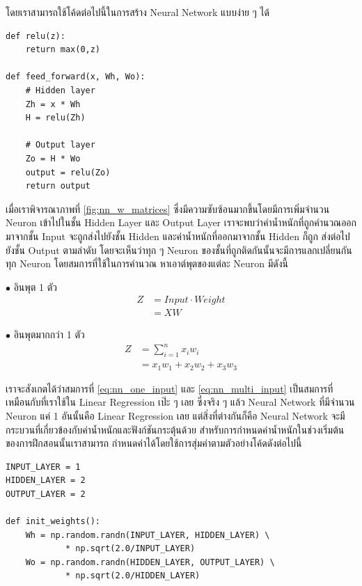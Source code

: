 โดยเราสามารถใช้โค้ดต่อไปนี้ในการสร้าง Neural Network แบบง่าย ๆ ได้

\begin{lstlisting}[style=MyPython]
def relu(z):
    return max(0,z)

def feed_forward(x, Wh, Wo):
    # Hidden layer
    Zh = x * Wh
    H = relu(Zh)

    # Output layer
    Zo = H * Wo
    output = relu(Zo)
    return output
\end{lstlisting}

\vspace{1em}
เมื่อเราพิจารณาภาพที่ \ref{fig:nn_w_matrices} ซึ่งมีความซับซ้อนมากขึ้นโดยมีการเพิ่มจำนวน Neuron เข้าไปในชั้น Hidden Layer และ 
Output Layer เราจะพบว่าค่าน้ำหนักที่ถูกคำนวณออกมาจากชั้น Input จะถูกส่งไปยังชั้น Hidden และค่าน้ำหนักที่ออกมาจากชั้น Hidden ก็ถูก%
ส่งต่อไปยังชั้น Output ตามลำดับ โดยจะเห็นว่าทุก ๆ Neuron ของชั้นที่ถูกติดกันนั้นจะมีการแลกเปลี่ยนกันทุก Neuron โดยสมการที่ใช้ในการคำนวณ%
หาเอาต์พุตของแต่ละ Neuron มีดังนี้

\noindent $\bullet$ อินพุต 1 ตัว
\begin{align}\label{eq:nn_one_input}
    Z &= Input \cdot Weight \nonumber \\
    &= X W
\end{align}

\noindent $\bullet$ อินพุตมากกว่า 1 ตัว
\begin{align}\label{eq:nn_multi_input}
    Z &= \sum_{i=1}^{n}x_i w_i \nonumber \\
    &= x_1 w_1 + x_2 w_2 + x_3 w_3
\end{align}

เราจะสังเกตได้ว่าสมการที่ \ref{eq:nn_one_input} และ \ref{eq:nn_multi_input} เป็นสมการที่เหมือนกับที่เราใช้ใน Linear 
Regression เป๊ะ ๆ เลย ซึ่งจริง ๆ แล้ว Neural Network ที่มีจำนวน Neuron แค่ 1 อันนั้นคือ Linear Regression เลย แต่สิ่งที่ต่างกันก็คือ
Neural Network จะมีกระบวนที่เกี่ยวข้องกับค่าน้ำหนักและฟังก์ชันกระตุ้นด้วย สำหรับการกำหนดค่าน้ำหนักในช่วงเริ่มต้นของการฝึกสอนนั้นเราสามารถ%
กำหนดค่าได้โดยใช้การสุ่มค่าตามตัวอย่างโค้ดดังต่อไปนี้

\begin{lstlisting}[style=MyPython]
INPUT_LAYER = 1
HIDDEN_LAYER = 2
OUTPUT_LAYER = 2

def init_weights():
    Wh = np.random.randn(INPUT_LAYER, HIDDEN_LAYER) \
            * np.sqrt(2.0/INPUT_LAYER)
    Wo = np.random.randn(HIDDEN_LAYER, OUTPUT_LAYER) \
            * np.sqrt(2.0/HIDDEN_LAYER)
\end{lstlisting}

